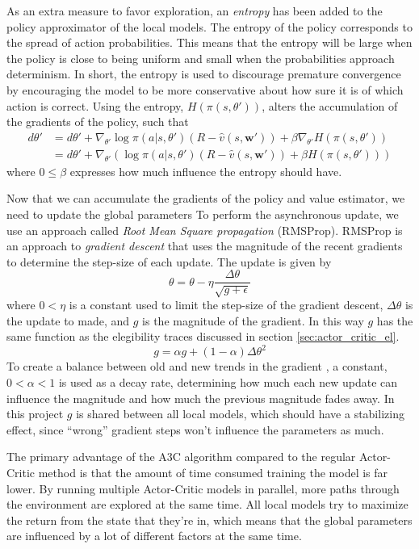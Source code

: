 \documentclass[11pt]{article}
\begin{document}
As an extra measure to favor exploration, an \textit{entropy} has been added
to the policy approximator of the local models.
The entropy of the policy corresponds to the spread of action probabilities.
This means that the entropy will be large when the policy is close to being
uniform and small when the probabilities approach determinism.
In short, the entropy is used to discourage premature convergence
by encouraging the model to be more conservative about how sure it is
of which action is correct.
Using the entropy, $H(\pi(s, \theta'))$, alters the accumulation of the gradients
of the policy, such that
\begin{equation}
    \begin{aligned}
        d\theta' & = d\theta' + \nabla_{\theta'} \log \pi(a|s, \theta')(R - \hat{v}(s, \mathbf{w}')) + \beta \nabla_{\theta'} H(\pi(s, \theta'))\\
                 & = d\theta' + \nabla_{\theta'} (\log \pi(a|s, \theta')(R - \hat{v}(s, \mathbf{w}')) + \beta H(\pi(s, \theta')))
    \end{aligned}
\end{equation}
where $0 \leq \beta$ expresses how much influence the entropy should have.

Now that we can accumulate the gradients of the policy and value estimator, we need to update the
global parameters
To perform the asynchronous update, we use an approach called \textit{Root Mean Square propagation} (RMSProp).
RMSProp is an approach to \textit{gradient descent} 
that uses the magnitude of the recent gradients to
determine the step-size of each update.
The update is given by 
\begin{equation}
    \theta = \theta - \eta \frac{\Delta \theta}{\sqrt{g + \epsilon}}
\end{equation}
where $0 < \eta$ is a constant used to limit the step-size of the gradient descent, $\Delta \theta$ is
the update to made, and 
$g$ is the magnitude of the gradient.
In this way $g$ has the same function as the elegibility traces discussed in
section \ref{sec:actor_critic_el}.
\begin{equation}
    g = \alpha g + (1 - \alpha) \Delta \theta^2
\end{equation}
To create a balance between old and new trends in the gradient
, a constant, $0 < \alpha < 1$ is used as a decay rate,
determining how much each new update can influence the magnitude and how much the previous magnitude fades away.
In this project $g$ is shared between all local models, which should have a stabilizing
effect, since “wrong” gradient steps won't influence the parameters as much.

The primary advantage of the A3C algorithm compared to the regular Actor-Critic method
is that the amount of time consumed training the model is far lower.
By running multiple Actor-Critic models in parallel, more paths through the environment are explored
at the same time.
All local models try to maximize the return from the state that they're in, which means that
the global parameters are influenced by a lot of different factors at the same time.
\end{document}
